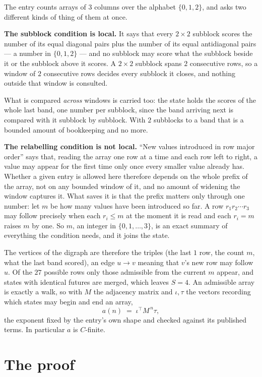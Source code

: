 \documentclass[11pt,a4paper]{article}
\theoremstyle{plain}
\theoremstyle{definition}
\begin{document}
The entry counts arrays of 3 columns over the alphabet $\{0,1,2\}$, and asks two different kinds of thing of them at once.

\textbf{The subblock condition is local.} It says that every $2\times2$ subblock scores the number of its equal diagonal pairs plus the number of its equal antidiagonal pairs --- a number in $\{0,1,2\}$ --- and no subblock may score what the subblock beside it or the subblock above it scores. A $ 2\times2$ subblock spans $2$ consecutive rows, so a window of $2$ consecutive rows decides every subblock it closes, and nothing outside that window is consulted.

What is compared \emph{across} windows is carried too: the state holds the scores of the whole last band, one number per subblock, since the band arriving next is compared with it subblock by subblock. With $2$ subblocks to a band that is a bounded amount of bookkeeping and no more.

\textbf{The relabelling condition is not local.} ``New values introduced in row major order'' says that, reading the array one row at a time and each row left to right, a value may appear for the first time only once every smaller value already has. Whether a given entry is allowed here therefore depends on the whole prefix of the array, not on any bounded window of it, and no amount of widening the window captures it. What saves it is that the prefix matters only through one number: let $m$ be how many values have been introduced so far. A row $r_1r_2\cdots r_3$ may follow precisely when each $r_i\le m$ at the moment it is read and each $r_i=m$ raises $m$ by one. So $m$, an integer in $\{0,1,\dots,3\}$, is an exact summary of everything the condition needs, and it joins the state.

The vertices of the digraph are therefore the triples (the last $1$ row, the count $m$, what the last band scored), an edge $u\to v$ meaning that $v$'s new row may follow $u$. Of the $27$ possible rows only those admissible from the current $m$ appear, and states with identical futures are merged, which leaves $S=4$. An admissible array is exactly a walk, so with $M$ the adjacency matrix and $\iota,\tau$ the vectors recording which states may begin and end an array,
\[
a(n)\;=\;\iota^{\!\top}M^{\,n}\tau ,
\]
the exponent fixed by the entry's own shape and checked against its published terms. In
particular $a$ is $C$-finite.

\section{The proof}
\end{document}
